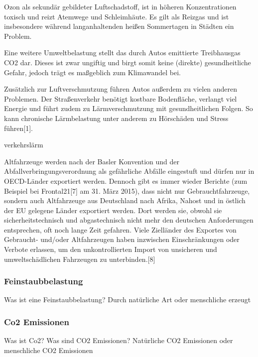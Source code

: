 Ozon als sekundär gebildeter Luftschadstoff, ist in höheren Konzentrationen toxisch und reizt Atemwege und Schleimhäute. Es gilt als Reizgas und ist insbesondere während langanhaltenden heißen Sommertagen in Städten ein Problem.



Eine weitere Umweltbelastung stellt das durch Autos emittierte Treibhausgas CO2 dar. Dieses ist zwar ungiftig und birgt somit keine (direkte) gesundheitliche Gefahr, jedoch trägt es maßgeblich zum Klimawandel bei.

Zusätzlich zur Luftverschmutzung führen Autos außerdem zu vielen anderen Problemen. Der Straßenverkehr benötigt kostbare Bodenfläche, verlangt viel Energie und führt zudem zu Lärmverschmutzung mit gesundheitlichen Folgen. So kann chronische Lärmbelastung unter anderem zu Hörschäden und Stress führen[1].

verkehrslärm


Altfahrzeuge werden nach der Basler Konvention und der Abfallverbringungsverordnung als gefährliche Abfälle eingestuft und dürfen nur in OECD-Länder exportiert werden. Dennoch gibt es immer wieder Berichte (zum Beispiel bei Frontal21[7] am 31. März 2015), dass nicht nur Gebrauchtfahrzeuge, sondern auch Altfahrzeuge aus Deutschland nach Afrika, Nahost und in östlich der EU gelegene Länder exportiert werden. Dort werden sie, obwohl sie sicherheitstechnisch und abgastechnisch nicht mehr den deutschen Anforderungen entsprechen, oft noch lange Zeit gefahren. Viele Zielländer des Exportes von Gebraucht- und/oder Altfahrzeugen haben inzwischen Einschränkungen oder Verbote erlassen, um den unkontrollierten Import von unsicheren und umweltschädlichen Fahrzeugen zu unterbinden.[8]


\subsubsection{Feinstaubbelastung}
Was ist eine Feinstaubbelastung?
Durch natürliche Art oder menschliche erzeugt
\subsubsection{Co2 Emissionen}
Was ist Co2?
Was sind CO2 Emissionen?
Natürliche CO2 Emissionen oder menschliche CO2 Emissionen
